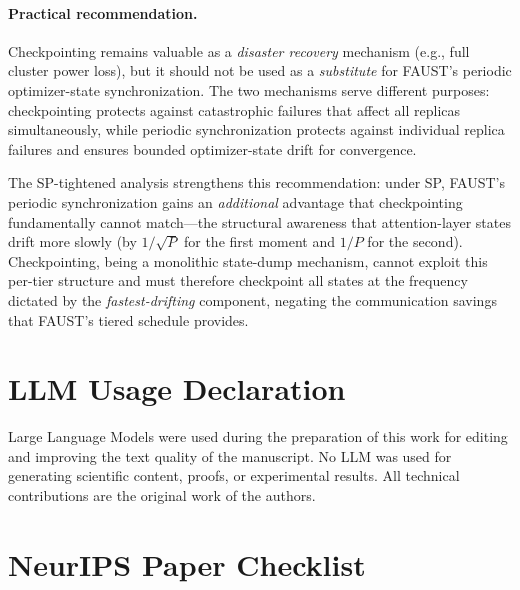 \documentclass{article}
\begin{document}
\paragraph{Practical recommendation.}
Checkpointing remains valuable as a \emph{disaster recovery} mechanism
(e.g., full cluster power loss), but it should not be used as a
\emph{substitute} for FAUST's periodic optimizer-state
synchronization. The two mechanisms serve different purposes:
checkpointing protects against catastrophic failures that affect all
replicas simultaneously, while periodic synchronization protects against
individual replica failures and ensures bounded optimizer-state drift
for convergence.

The SP-tightened analysis strengthens this recommendation: under SP,
FAUST's periodic synchronization gains an \emph{additional} advantage
that checkpointing fundamentally cannot match---the structural
awareness that attention-layer states drift more slowly (by $1/\sqrt{P}$
for the first moment and $1/P$ for the second). Checkpointing, being a
monolithic state-dump mechanism, cannot exploit this per-tier structure
and must therefore checkpoint all states at the frequency dictated by
the \emph{fastest-drifting} component, negating the communication savings
that FAUST's tiered schedule provides.



\section{LLM Usage Declaration}
\label{sec:llm_usage}

Large Language Models were used during the preparation of this work for editing and improving the
text quality of the manuscript. No LLM was used for generating scientific content, proofs, or
experimental results. All technical contributions are the original work of the authors.


\newpage
\section*{NeurIPS Paper Checklist}
\end{document}

